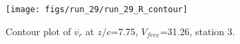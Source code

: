 \begin{figure}[H]
\centering
\texttt{[image: figs/run\_29/run\_29\_R\_contour]}
\caption{Contour plot of $\overline{v_{r}}$ at $z/c$=7.75, $V_{free}$=31.26, station 3.}
\label{fig:run_29_R_contour}
\end{figure}


